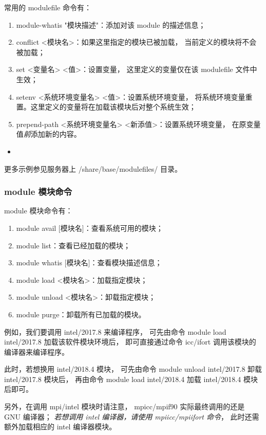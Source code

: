 \documentclass[UTF8]{ctexart}
\newcommand{\myem}[1]{{\color{red}\em #1}}
\newcommand{\mynote}[1]{\colorbox{gray!35}{#1}}
\newcommand{\mynnote}[1]{\colorbox{gray!15}{\color{blue!65}#1}}
\newcommand{\insertbash}[2]{\begin{itemize}\item[]\end{itemize}}
\begin{document}
常用的 modulefile 命令有：
\begin{enumerate}[\hspace{15mm}（1）]
  \item \mynote{module-whatis "模块描述"}：添加对该 module 的描述信息；
  \item \mynote{conflict <模块名>}：如果这里指定的模块已被加载，
    当前定义的模块将不会被加载；
  \item \mynote{set <变量名> <值>}：设置变量，
    这里定义的变量仅在该 modulefile 文件中生效；
  \item \mynote{setenv <系统环境变量名> <值>}：设置系统环境变量，
    将系统环境变量重置。这里定义的变量将在加载该模块后对整个系统生效；
  \item \mynote{prepend-path <系统环境变量名> <新添值>}：设置系统环境变量，
    在原变量值{\em 前}添加新的内容。
\end{enumerate}

\insertbash{material/module.sh}{modulefile 文件书写示例}

更多示例参见服务器上 /share/base/modulefiles/ 目录。

\subsubsection{module 模块命令}
module 模块命令有：
\begin{enumerate}[\hspace{15mm}（1）]
  \item \mynnote{module avail [模块名]}：查看系统可用的模块；
  \item \mynnote{module list}：查看已经加载的模块；
  \item \mynnote{module whatis [模块名]}：查看模块描述信息；
  \item \mynnote{module load <模块名>}：加载指定模块；
  \item \mynnote{module unload <模块名>}：卸载指定模块；
  \item \mynnote{module purge}：卸载所有已加载的模块。
\end{enumerate}

例如，我们要调用 intel/2017.8 来编译程序，
可先由命令 \mynote{module load intel/2017.8} 加载该软件模块环境后，
即可直接通过命令 icc/ifort 调用该模块的编译器来编译程序。

此时，若想换用 intel/2018.4 模块，
可先由命令 \mynote{module unload intel/2017.8} 卸载 intel/2017.8 模块后，
再由命令 \mynote{module load intel/2018.4} 加载 intel/2018.4 模块后即可。

另外，在调用 mpi/intel 模块时请注意，
mpicc/mpif90 实际最终调用的还是 GNU 编译器；
\myem{若想调用 intel 编译器，请使用 mpiicc/mpiifort 命令}，
此时还需额外加载相应的 intel 编译器模块。
\end{document}
